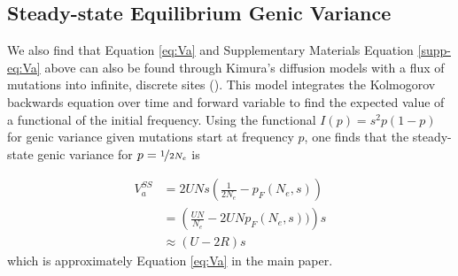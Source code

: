 \documentclass[11pt]{article}
\begin{document}
\subsection{Steady-state Equilibrium Genic Variance} \label{supp:genic-va}

We also find that Equation \eqref{eq:Va} and Supplementary Materials Equation
\ref{supp-eq:Va} above can also be found through Kimura's diffusion models with
a flux of mutations into infinite, discrete sites (\citeyear{Kimura1969-jw}).
This model integrates the Kolmogorov backwards equation over time and forward
variable to find the expected value of a functional of the initial frequency.
Using the functional $I(p) = s^2 p(1-p)$ for genic variance given mutations
start at frequency $p$, one finds that the steady-state genic variance for
$p=\nicefrac{1}{2N_e}$ is

\begin{align}
    V_a^{SS} &= 2 U N s \left(\frac{1}{2N_e} - p_F(N_e, s)\right) \\
             &= \left(\frac{UN}{N_e} - 2 U Np_F(N_e, s))\right)s \nonumber \\
             &\approx \left(U - 2 R\right)s \nonumber
\end{align}
%
which is approximately Equation \eqref{eq:Va} in the main paper.


\end{document}
